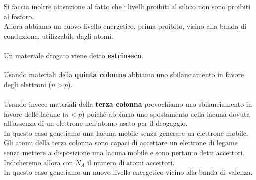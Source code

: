 \documentclass[../main.tex]{subfiles}
\begin{document}
	Si faccia inoltre attenzione al fatto che i livelli proibiti al silicio non sono proibiti al fosforo. \\
	Allora abbiamo un nuovo livello energetico, prima proibito, vicino alla banda di conduzione, utilizzabile dagli atomi.\\\\
	Un materiale drogato viene detto \textbf{estrinseco}.\\\\
	Usando materiali della \textbf{quinta colonna} abbiamo uno sbilanciamento in favore degli elettroni ($n > p$).\\\\
	Usando invece materiali della \textbf{terza colonna} provochiamo uno sbilanciamento in favore delle lacune ($n < p$) poiché abbiamo uno spostamento della lacuna dovuta all’assenza di un elettrone nell’atomo usato per il drogaggio. \\
	In questo caso generiamo una lacuna mobile senza generare un elettrone mobile. \\
	Gli atomi della terza colonna sono capaci di accettare un elettrone di legame senza mettere a disposizione una lacuna mobile e sono pertanto detti accettori. \\
	Indicheremo allora con $N_A$ il numero di atomi accettori. \\
	In questo caso generiamo un nuovo livello energetico vicino alla banda di valenza.
\end{document}
